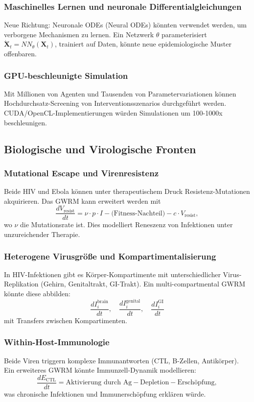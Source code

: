 ﻿\documentclass[a4paper,12pt]{article}
\theoremstyle{definition}
\begin{document}
\subsubsection{Maschinelles Lernen und neuronale Differentialgleichungen}
Neue Richtung: Neuronale ODEs (Neural ODEs) könnten verwendet werden, um verborgene Mechanismen zu lernen. Ein Netzwerk $\theta$ parameterisiert $\dot{\mathbf{X}}_t = NN_\theta(\mathbf{X}_t)$, trainiert auf Daten, könnte neue epidemiologische Muster offenbaren.

\subsubsection{GPU-beschleunigte Simulation}
Mit Millionen von Agenten und Tausenden von Parametervariationen können Hochdurchsatz-Screening von Interventionsszenarios durchgeführt werden. CUDA/OpenCL-Implementierungen würden Simulationen um 100-1000x beschleunigen.

\subsection{Biologische und Virologische Fronten}

\subsubsection{Mutational Escape und Virenresistenz}
Beide HIV und Ebola können unter therapeutischem Druck Resistenz-Mutationen akquirieren. Das GWRM kann erweitert werden mit
\[
\frac{dV_{\text{resist}}}{dt} = \nu \cdot p \cdot I - \text{(Fitness-Nachteil)} - c \cdot V_{\text{resist}},
\]
wo $\nu$ die Mutationsrate ist. Dies modelliert Reneszenz von Infektionen unter unzureichender Therapie.

\subsubsection{Heterogene Virusgröße und Kompartimentalisierung}
In HIV-Infektionen gibt es Körper-Kompartimente mit unterschiedlicher Virus-Replikation (Gehirn, Genitaltrakt, GI-Trakt). Ein multi-compartmental GWRM könnte diese abbilden:
\[
\frac{dI_i^{\text{brain}}}{dt}, \quad \frac{dI_i^{\text{genital}}}{dt}, \quad \frac{dI_i^{\text{GI}}}{dt}
\]
mit Transfers zwischen Kompartimenten.

\subsubsection{Within-Host-Immunologie}
Beide Viren triggern komplexe Immunantworten (CTL, B-Zellen, Antikörper). Ein erweiteres GWRM könnte Immunzell-Dynamik modellieren:
\[
\frac{dE_{\text{CTL}}}{dt} = \text{Aktivierung durch Ag} - \text{Depletion} - \text{Erschöpfung},
\]
was chronische Infektionen und Immunerschöpfung erklären würde.
\end{document}

